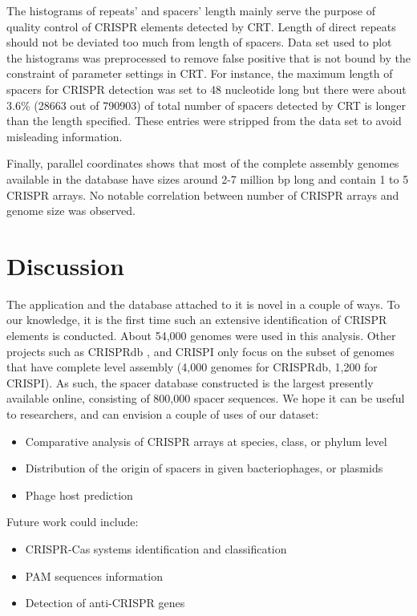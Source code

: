 \documentclass[11pt, a4paper,titlepage]{article}
\begin{document}
The histograms of repeats’ and spacers’ length mainly serve the
purpose of quality control of CRISPR elements detected by CRT. Length
of direct repeats should not be deviated too much from length of
spacers. Data set used to plot the histograms was preprocessed to
remove false positive that is not bound by the constraint of parameter
settings in CRT. For instance, the maximum length of spacers for
CRISPR detection was set to 48 nucleotide long but there were about
3.6\% (28663 out of 790903) of total number of spacers detected by CRT
is longer than the length specified. These entries were stripped from
the data set to avoid misleading information.

Finally, parallel coordinates shows that most of the complete assembly
genomes available in the database have sizes around 2-7 million bp
long and contain 1 to 5 CRISPR arrays. No notable correlation between
number of CRISPR arrays and genome size was observed.

\section{Discussion}

The application and the database attached to it is novel in a couple
of ways. To our knowledge, it is the first time such an extensive
identification of CRISPR elements is conducted. About 54,000 genomes
were used in this analysis. Other projects such as CRISPRdb
\cite{grissa2007crisprdb}, and CRISPI \cite{rousseau2009crispi} only
focus on the subset of genomes that have complete level assembly
(4,000 genomes for CRISPRdb, 1,200 for CRISPI). As such, the spacer
database constructed is the largest presently available online,
consisting of 800,000 spacer sequences. We hope it can be useful to
researchers, and can envision a couple of uses of our dataset:


\begin{itemize}
\item Comparative analysis of CRISPR arrays at species, class, or
  phylum level
\item Distribution of the origin of spacers in given bacteriophages,
  or plasmids
\item Phage host prediction
\end{itemize}

\noindent Future work could include:

\begin{itemize}
\item CRISPR-Cas systems identification and classification
\item PAM sequences information
\item Detection of anti-CRISPR genes
\end{itemize}
\end{document}
